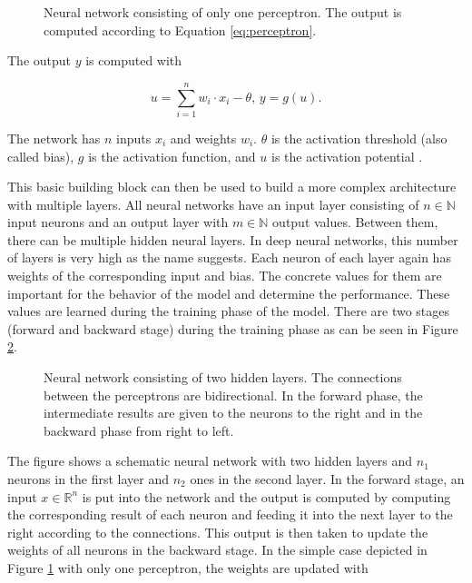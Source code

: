 \begin{figure}[H]
	\centering
	\def\svgscale{0.5}
	
	\caption{ Neural network consisting of only one perceptron. The output is computed according to Equation \ref{eq:perceptron}.}
	\label{fig:perceptron}
\end{figure}

The output $ y $ is computed with 

\begin{equation}
	\label{eq:perceptron}
	u = \sum_{i=1}^n w_i \cdot x_i - \theta  \text{,   } y = g(u).
\end{equation}

The network has $ n $ inputs $ x_i $ and weights $ w_i $. $ \theta $ is the activation threshold (also called bias), $ g $ is the activation function, and $ u $ is the activation potential \cite{da2017artificial}. 

This basic building block can then be used to build a more complex architecture with multiple layers. All neural networks have an input layer consisting of $ n \in \mathbb{N}$ input neurons and an output layer with $ m \in \mathbb{N} $ output values. Between them, there can be multiple hidden neural layers. In deep neural networks, this number of layers is very high as the name suggests. Each neuron of each layer again has weights of the corresponding input and bias. The concrete values for them are important for the behavior of the model and determine the performance. These values are learned during the training phase of the model. There are two stages (forward and backward stage) during the training phase as can be seen in Figure \ref{fig:network}.

\begin{figure}[ht]
	\centering
	\def\svgscale{0.5}
	
	\caption{ Neural network consisting of two hidden layers. The connections between the perceptrons are bidirectional. In the forward phase, the intermediate results are given to the neurons to the right and in the backward phase from right to left. }
	\label{fig:network}
\end{figure}

The figure shows a schematic neural network with two hidden layers and $ n_1 $ neurons in the first layer and $ n_2 $ ones in the second layer. In the forward stage, an input $ x \in \mathbb{R}^n $ is put into the network and the output is computed by computing the corresponding result of each neuron and feeding it into the next layer to the right according to the connections. This output is then taken to update the weights of all neurons in the backward stage. In the simple case depicted in Figure \ref{fig:perceptron} with only one perceptron, the weights are updated with  

